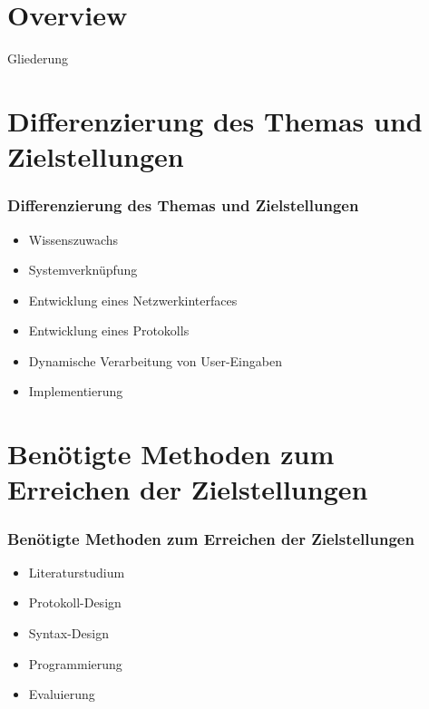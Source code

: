 \documentclass[newPxFont,numfooter,sectionpages]{beamer}
\begin{document}
%
%

\section*{Overview}
\begin{frame}{Gliederung}
\tableofcontents[hideallsubsections]
\end{frame}

%
%
\section{Differenzierung des Themas und Zielstellungen}
\begin{frame}
\frametitle{Differenzierung des Themas und Zielstellungen}
\begin{itemize}
\item Wissenszuwachs
\item Systemverknüpfung 
\item Entwicklung eines Netzwerkinterfaces
\item Entwicklung eines Protokolls
\item Dynamische Verarbeitung von User-Eingaben
\item Implementierung


\end{itemize}
\end{frame}

\section{Benötigte Methoden zum Erreichen der Zielstellungen}
\begin{frame}
\frametitle{Benötigte Methoden zum Erreichen der Zielstellungen}
\begin{itemize}


\item{Literaturstudium}
\item{Protokoll-Design}
\item{Syntax-Design}
\item Programmierung
\item{Evaluierung}

\end{itemize}

\end{frame}
\end{document}
